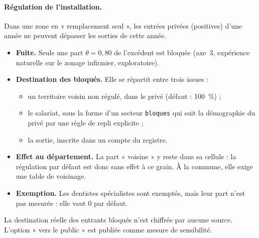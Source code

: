 \paragraph{Régulation de l'installation.} Dans une zone en « remplacement seul », les entrées
privées (positives) d'une année ne peuvent dépasser les sorties de cette année.
\begin{itemize}
  \item \textbf{Fuite.} Seule une part $\theta = 0{,}80$\suppose{} de l'excédent est bloquée (axe~3,
        expérience naturelle sur le zonage infirmier, exploratoire).
  \item \textbf{Destination des bloqués.} Elle se répartit entre trois issues :
        \begin{itemize}
          \item un territoire voisin non régulé, dans le privé (défaut : 100\suppose{}~\%) ;
          \item le salariat, sous la forme d'un secteur \texttt{bloques} qui suit la démographie du
                privé par une règle de repli explicite ;
          \item la sortie, inscrite dans un compte du registre.
        \end{itemize}
  \item \textbf{Effet au département.} La part « voisine » y reste dans sa cellule : la régulation par
        défaut est donc sans effet à ce grain. À la commune, elle exige une table de voisinage.
  \item \textbf{Exemption.} Les dentistes spécialistes sont exemptés, mais leur part n'est pas
        mesurée : elle vaut 0 par défaut.
\end{itemize}
La destination réelle des entrants bloqués n'est chiffrée par aucune source. L'option « vers le
public » est publiée comme mesure de sensibilité.


